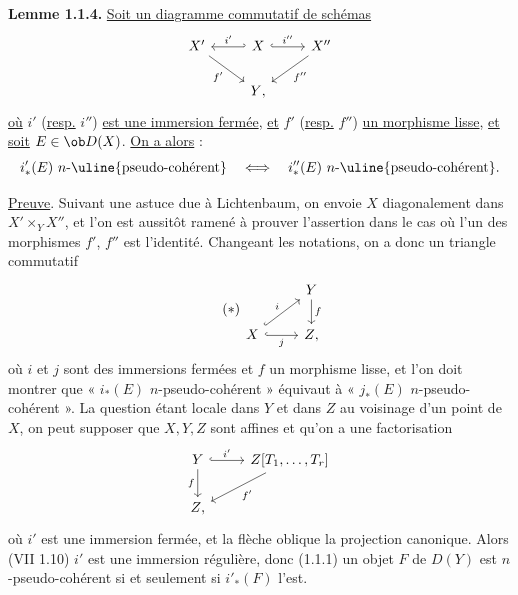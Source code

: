 \textbf{Lemme 1.1.4.}
\uline{Soit un diagramme commutatif de schémas}
\[
\begin{tikzcd}
X' \arrow[dr,"f'"'] & X \arrow[l,hook',"i'"'] \arrow[r,hook,"i''"] & X'' \arrow[dl,"f''"]\\
& Y{,} &
\end{tikzcd}
\]
\uline{où} \(i'\) (\uline{resp.} \(i''\)) \uline{est une immersion fermée}, \uline{et} \(f'\) (\uline{resp.} \(f''\)) \uline{un morphisme lisse}, \uline{et soit} \(E\in\ob D(X)\). \uline{On a alors} :
\[
  i'_*(E)\ n\text{-\uline{pseudo-cohérent}}
  \quad\Longleftrightarrow\quad
  i''_*(E)\ n\text{-\uline{pseudo-cohérent}}.
\]

\uline{Preuve}. Suivant une astuce due à Lichtenbaum, on envoie \(X\) diagonalement dans \(X'\times_YX''\), et l'on est aussitôt ramené à prouver l'assertion dans le cas où l'un des morphismes \(f'\), \(f''\) est l'identité. Changeant les notations, on a donc un triangle commutatif
\begin{equation}\tag{$*$}
\begin{tikzcd}
& Y \arrow[d,"f"]\\
X \arrow[r,hook,"j"'] \arrow[ur,hook,"i"] & Z{,}
\end{tikzcd}
\end{equation}
où \(i\) et \(j\) sont des immersions fermées et \(f\) un morphisme lisse, et l'on doit montrer que « \(i_*(E)\) \(n\)-pseudo-cohérent » équivaut à « \(j_*(E)\) \(n\)-pseudo-cohérent ». La question étant locale dans \(Y\) et dans \(Z\) au voisinage d'un point de \(X\), on peut supposer que \(X,Y,Z\) sont affines et qu'on a une factorisation
\[
\begin{tikzcd}
Y \arrow[r,hook,"i'"] \arrow[d,"f"'] & Z[T_1,\ldots,T_r]\arrow[dl,"f'"]\\
Z{,}&
\end{tikzcd}
\]
où \(i'\) est une immersion fermée, et la flèche oblique la projection canonique. Alors (VII 1.10) \(i'\) est une immersion régulière, donc (1.1.1) un objet \(F\) de \(D(Y)\) est \(n\)-pseudo-cohérent si et seulement si \(i'_*(F)\) l'est.

